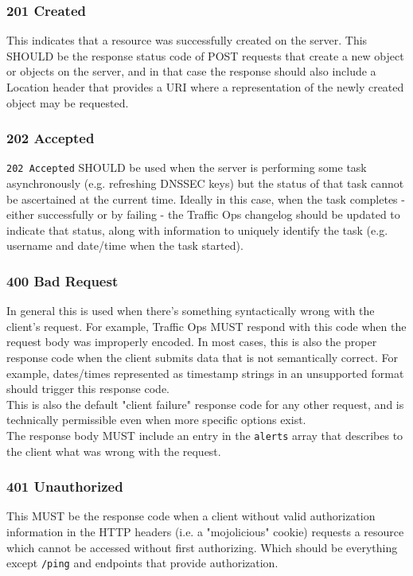 \documentclass{article}
\newcommand{\code}[1]{\texttt{\color{inlinecodecolor}#1}}
\begin{document}
\subsubsection{201 Created}
This indicates that a resource was successfully created on the server. This SHOULD be the response status code of POST requests that create a new
object or objects on the server, and in that case the response should also include a Location header that provides a URI where a representation of
the newly created object may be requested.

\subsubsection{202 Accepted}
\code{202 Accepted} SHOULD be used when the server is performing some task asynchronously (e.g. refreshing DNSSEC keys) but the status of that task
cannot be ascertained at the current time. Ideally in this case, when the task completes - either successfully or by failing - the Traffic Ops changelog
should be updated to indicate that status, along with information to uniquely identify the task (e.g. username and date/time when the task started).

\subsubsection{400 Bad Request\label{sec:400}}
In general this is used when there's something syntactically wrong with the client's request. For example, Traffic Ops MUST respond with this code
when the request body was improperly encoded. In most cases, this is also the proper response code when the client submits data that is not semantically
correct. For example, dates/times represented as timestamp strings in an unsupported format should trigger this response code.\\
This is also the default "client failure" response code for any other request, and is technically permissible even when more specific options exist.\\
The response body MUST include an entry in the \code{alerts} array that describes to the client what was wrong with the request.

\subsubsection{401 Unauthorized\label{sec:401}}
This MUST be the response code when a client without valid authorization information in the HTTP headers (i.e. a "mojolicious" cookie) requests a resource
which cannot be accessed without first authorizing. Which should be everything except \code{/ping} and endpoints that provide authorization.
\end{document}
